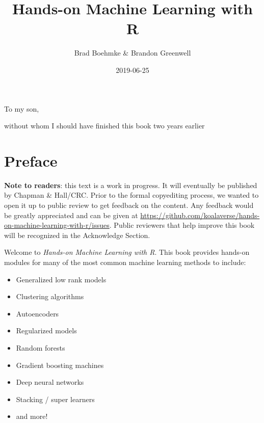 \documentclass[]{krantz}
\title{Hands-on Machine Learning with R}
\author{Brad Boehmke \& Brandon Greenwell}
\date{2019-06-25}
\makeatletter
\providecommand{\tightlist}{%
  \setlength{\itemsep}{0pt}\setlength{\parskip}{0pt}}
\newenvironment{kframe}{%
\medskip{}
\setlength{\fboxsep}{.8em}
 \def\at@end@of@kframe{}%
 \ifinner\ifhmode%
  \def\at@end@of@kframe{\end{minipage}}%
  \begin{minipage}{\columnwidth}%
 \fi\fi%
 \def\FrameCommand##1{\hskip\@totalleftmargin \hskip-\fboxsep
 \colorbox{shadecolor}{##1}\hskip-\fboxsep
     \hskip-\linewidth \hskip-\@totalleftmargin \hskip\columnwidth}%
 \MakeFramed {\advance\hsize-\width
   \@totalleftmargin\z@ \linewidth\hsize
   \@setminipage}}%
 {\par\unskip\endMakeFramed%
 \at@end@of@kframe}
\newenvironment{block}[1]
  {
  \begin{itemize}
  \renewcommand{\labelitemi}{
    \raisebox{-.7\height}[0pt][0pt]{
      {\setkeys{Gin}{width=3em,keepaspectratio}\texttt{[image: icons/\#1]}}
    }
  }
  \setlength{\fboxsep}{1em}
  \begin{kframe}
  \item
  }
  {
  \end{kframe}
  \end{itemize}
  }
\newenvironment{note}
  {\begin{block}{note}}
  {\end{block}}
\makeatother
\begin{document}
\maketitle


\thispagestyle{empty}

\begin{center}
To my son,

without whom I should have finished this book two years earlier
\end{center}

\setlength{\abovedisplayskip}{-5pt}
\setlength{\abovedisplayshortskip}{-5pt}

{
\hypersetup{linkcolor=}
\setcounter{tocdepth}{2}
\tableofcontents
}
\listoftables
\listoffigures
\hypertarget{preface}{%
\chapter*{Preface}\label{preface}}


\begin{note}
\textbf{Note to readers}: this text is a work in progress. It will
eventually be published by Chapman \& Hall/CRC. Prior to the formal
copyediting process, we wanted to open it up to public review to get
feedback on the content. Any feedback would be greatly appreciated and
can be given at
\url{https://github.com/koalaverse/hands-on-machine-learning-with-r/issues}.
Public reviewers that help improve this book will be recognized in the
Acknowledge Section.
\end{note}

Welcome to \emph{Hands-on Machine Learning with R}. This book provides hands-on modules for many of the most common machine learning methods to include:

\begin{itemize}
\tightlist
\item
  Generalized low rank models
\item
  Clustering algorithms
\item
  Autoencoders
\item
  Regularized models
\item
  Random forests
\item
  Gradient boosting machines
\item
  Deep neural networks
\item
  Stacking / super learners
\item
  and more!
\end{itemize}
\end{document}
